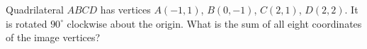 Quadrilateral $ABCD$ has vertices $A(-1,1)$, $B(0,-1)$, $C(2,1)$, $D(2,2)$. It is rotated $90^\circ$ clockwise about the origin. What is the sum of all eight coordinates of the image vertices?
